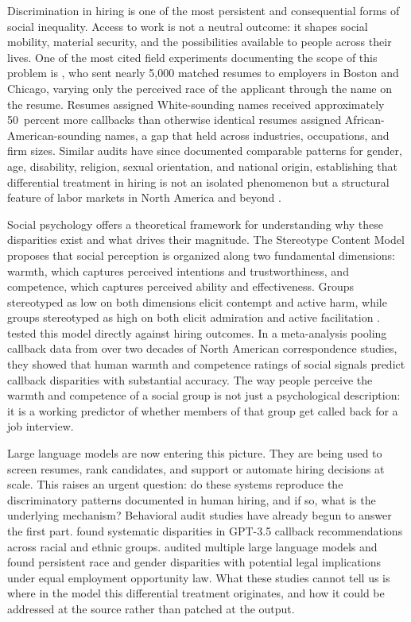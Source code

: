 \documentclass[twocolumn]{article}
\begin{document}
Discrimination in hiring is one of the most persistent and consequential
forms of social inequality.
Access to work is not a neutral outcome: it shapes social mobility,
material security, and the possibilities available to people across their
lives.
One of the most cited field experiments documenting the scope of this
problem is \citet{bertrand2004emily}, who sent nearly 5{,}000 matched
resumes to employers in Boston and Chicago, varying only the perceived
race of the applicant through the name on the resume.
Resumes assigned White-sounding names received approximately 50~percent
more callbacks than otherwise identical resumes assigned
African-American-sounding names, a gap that held across industries,
occupations, and firm sizes.
Similar audits have since documented comparable patterns for gender, age,
disability, religion, sexual orientation, and national origin,
establishing that differential treatment in hiring is not an isolated
phenomenon but a structural feature of labor markets in North America and
beyond \citep{correll2007getting, neumark2019older, tilcsik2011pride}.

Social psychology offers a theoretical framework for understanding why
these disparities exist and what drives their magnitude.
The Stereotype Content Model \citep[SCM;][]{fiske2002model} proposes that
social perception is organized along two fundamental dimensions: warmth,
which captures perceived intentions and trustworthiness, and competence,
which captures perceived ability and effectiveness.
Groups stereotyped as low on both dimensions elicit contempt and active
harm, while groups stereotyped as high on both elicit admiration and
active facilitation \citep{cuddy2007biasmap}.
\citet{gallo2024warmth} tested this model directly against hiring outcomes.
In a meta-analysis pooling callback data from over two decades of North
American correspondence studies, they showed that human warmth and
competence ratings of social signals predict callback disparities with
substantial accuracy.
The way people perceive the warmth and competence of a social group is
not just a psychological description: it is a working predictor of
whether members of that group get called back for a job interview.

Large language models are now entering this picture.
They are being used to screen resumes, rank candidates, and support or
automate hiring decisions at scale.
This raises an urgent question: do these systems reproduce the
discriminatory patterns documented in human hiring, and if so, what is
the underlying mechanism?
Behavioral audit studies have already begun to answer the first part.
\citet{an2024llm} found systematic disparities in GPT-3.5 callback
recommendations across racial and ethnic groups.
\citet{gaebler2024auditing} audited multiple large language models and found
persistent race and gender disparities with potential legal implications
under equal employment opportunity law.
What these studies cannot tell us is where in the model this differential
treatment originates, and how it could be addressed at the source rather
than patched at the output.
\end{document}
